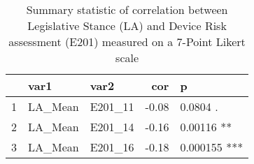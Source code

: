 \begin{table}[ht]
\centering
\begin{tabular}{rllrl}
  \hline
 & var1 & var2 & cor & p \\ 
  \hline
1 & LA\_Mean & E201\_11 & -0.08 & 0.0804 . \\ 
  2 & LA\_Mean & E201\_14 & -0.16 & 0.00116 ** \\ 
  3 & LA\_Mean & E201\_16 & -0.18 & 0.000155 *** \\ 
   \hline
\end{tabular}
\caption{Summary statistic of correlation between Legislative Stance (LA) and Device Risk assessment (E201) measured on a 7-Point Likert scale} 
\end{table}
